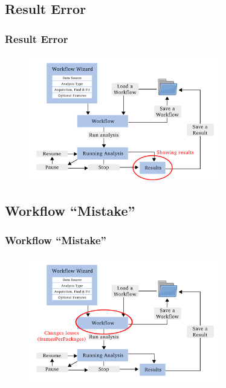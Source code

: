 \documentclass[aspectratio=169]{beamer}
\begin{document}
\subsection{Result Error}
\begin{frame}
\frametitle{Result Error}
\begin{figure}[h!]
    \centering	\includegraphics[width=0.75\textwidth]{./images/results_error.pdf} 
    \end{figure} 
 
\end{frame}



\subsection{Workflow ``Mistake''}
\begin{frame}
\frametitle{Workflow ``Mistake''}
\begin{figure}[h!]
    \centering	\includegraphics[width=0.75\textwidth]{./images/workflow_error.pdf} 
    \end{figure} 
 
\end{frame}
\end{document}
